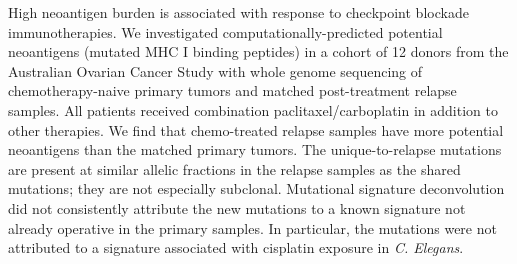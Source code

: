 High neoantigen burden is associated with response to checkpoint blockade immunotherapies. We investigated computationally-predicted potential neoantigens (mutated MHC I binding peptides) in a cohort of 12 donors from the Australian Ovarian Cancer Study with whole genome sequencing of chemotherapy-naive primary tumors and matched post-treatment relapse samples. All patients received combination paclitaxel/carboplatin in addition to other therapies. We find that chemo-treated relapse samples have more potential neoantigens than the matched primary tumors. The unique-to-relapse mutations are present at similar allelic fractions in the relapse samples as the shared mutations; they are not especially subclonal. Mutational signature deconvolution did not consistently attribute the new mutations to a known signature not already operative in the primary samples. In particular, the mutations were not attributed to a signature associated with cisplatin exposure in \textit{C. Elegans}.

